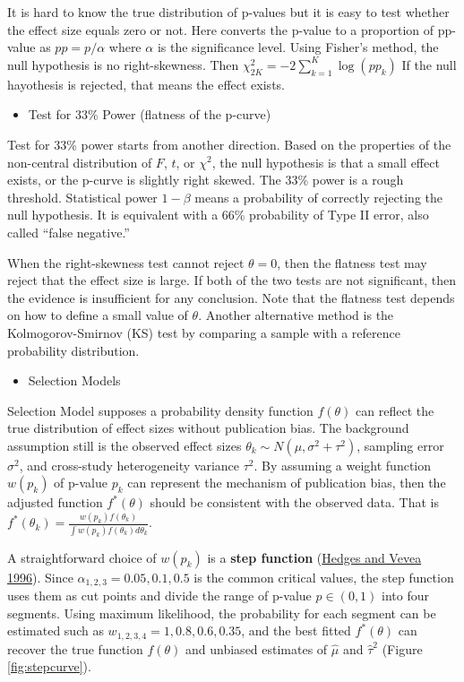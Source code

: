 \documentclass[
  11pt,
  openany]{memoir}
\providecommand{\tightlist}{%
  \setlength{\itemsep}{0pt}\setlength{\parskip}{0pt}}
\begin{document}
It is hard to know the true distribution of p-values but it is easy to test whether the effect size equals zero or not.
Here converts the p-value to a proportion of pp-value as \(pp=p/\alpha\) where \(\alpha\) is the significance level.
Using Fisher's method, the null hypothesis is no right-skewness. Then \(\chi^2_{2K} = -2 \sum^K_{k=1} \log(pp_k)\)
If the null hayothesis is rejected, that means the effect exists.

\begin{itemize}
\tightlist
\item
  Test for 33\% Power (flatness of the p-curve)
\end{itemize}

Test for 33\% power starts from another direction.
Based on the properties of the non-central distribution of \(F\), \(t\), or \(\chi^2\), the null hypothesis is that a small effect exists, or the p-curve is slightly right skewed.
The 33\% power is a rough threshold.
Statistical power \(1-\beta\) means a probability of correctly rejecting the null hypothesis.
It is equivalent with a 66\% probability of Type II error, also called ``false negative.''

When the right-skewness test cannot reject \(\theta=0\), then the flatness test may reject that the effect size is large.
If both of the two tests are not significant, then the evidence is insufficient for any conclusion.
Note that the flatness test depends on how to define a small value of \(\theta\).
Another alternative method is the Kolmogorov-Smirnov (KS) test by comparing a sample with a reference probability distribution.

\begin{itemize}
\tightlist
\item
  Selection Models
\end{itemize}

Selection Model supposes a probability density function \(f(\theta)\) can reflect the true distribution of effect sizes without publication bias.
The background assumption still is the observed effect sizes \(\theta_k \sim N(\mu,\sigma^2+\tau^2)\), sampling error \(\sigma^2\), and cross-study heterogeneity variance \(\tau^2\).
By assuming a weight function \(w(p_k)\) of p-value \(p_k\) can represent the mechanism of publication bias, then the adjusted function \(f^*(\theta)\) should be consistent with the observed data.
That is \(f^*(\theta_k) = \frac{w(p_k)f(\theta_k)}{\int w(p_k) f(\theta_k) d\theta_k}\).

A straightforward choice of \(w(p_k)\) is a \textbf{step function} (\protect\hyperlink{ref-hedgesEstimatingEffectSize1996}{Hedges and Vevea 1996}).
Since \(\alpha_{1,2,3}=0.05, 0.1, 0.5\) is the common critical values, the step function uses them as cut points and divide the range of p-value \(p\in(0,1)\) into four segments.
Using maximum likelihood, the probability for each segment can be estimated such as \(w_{1,2,3,4}=1,0.8,0.6,0.35\), and the best fitted \(f^*(\theta)\) can recover the true function \(f(\theta)\) and unbiased estimates of \(\hat\mu\) and \(\hat\tau^2\) (Figure \ref{fig:stepcurve}).
\end{document}
